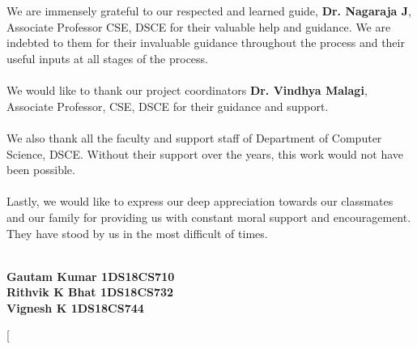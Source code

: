 \documentclass[12pt,a4paper,twocolumn,fleqn]{article}
\begin{document}
\\
\hfill
\\
We are immensely grateful to our respected and learned guide, \textbf{Dr. Nagaraja J}, Associate Professor CSE, DSCE  for their valuable help and guidance. We are indebted to them for their invaluable guidance throughout the process and their useful inputs at all stages of the process.
\\
\hfill
\\
We would like to thank our project coordinators \textbf{Dr. Vindhya Malagi}, Associate Professor, CSE, DSCE for their guidance and support.
\\
\hfill
\\
We also thank all the faculty and support staff of Department of Computer Science, DSCE. Without their support over the years, this work would not have been possible.
\\
\hfill
\\
Lastly, we would like to express our deep appreciation towards our classmates and our family for providing us with constant moral support and encouragement. They have stood by us in the most difficult of times.
\\
\hfill
\\
\begin{flushright}
\textbf{Gautam Kumar \space 1DS18CS710} \\
\textbf{Rithvik K Bhat \space 1DS18CS732} \\
\textbf{Vignesh K \space 1DS18CS744} \\ 
\end{flushright}
\newpage
  \pagestyle{fancy}
  \fancyhf{}
  \thispagestyle{empty}
\twocolumn[
\end{document}
